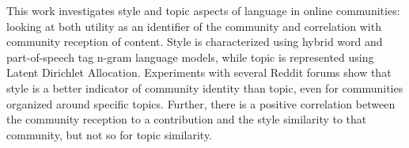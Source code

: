 This work investigates style and topic aspects of language in online communities: looking at both utility as an identifier of the community and correlation with community reception of content. Style is characterized using hybrid word and part-of-speech tag n-gram language models, while topic is represented using Latent Dirichlet Allocation. Experiments with several Reddit forums show that style is a better indicator of community identity than topic, even for communities organized around specific topics. Further, there is a positive correlation between the community reception to a contribution and the style similarity to that community, but not so for topic similarity.
